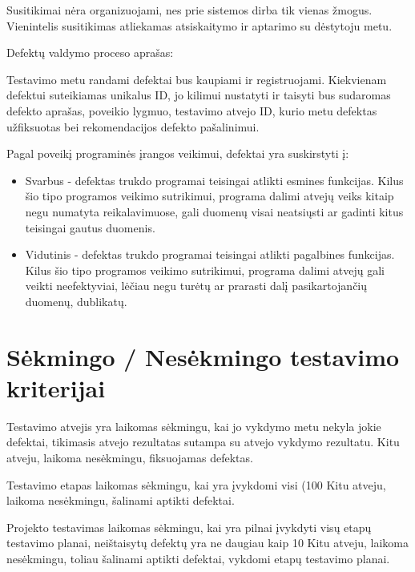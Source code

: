 Susitikimai nėra organizuojami, nes prie sistemos dirba tik vienas žmogus. 
Vienintelis susitikimas atliekamas atsiskaitymo ir aptarimo su dėstytoju metu.

Defektų valdymo proceso aprašas:

Testavimo metu randami defektai bus kaupiami ir registruojami. 
Kiekvienam defektui suteikiamas unikalus ID, jo kilimui nustatyti ir taisyti bus sudaromas defekto aprašas, poveikio lygmuo, testavimo atvejo ID, kurio metu defektas užfiksuotas bei rekomendacijos defekto pašalinimui.

Pagal poveikį programinės įrangos veikimui, defektai yra suskirstyti į:

\begin{itemize}
	\item Svarbus - defektas trukdo programai teisingai atlikti esmines funkcijas. Kilus šio tipo programos
	veikimo sutrikimui, programa dalimi atvejų veiks kitaip negu numatyta reikalavimuose,
	gali duomenų visai neatsiųsti ar gadinti kitus teisingai gautus duomenis.
	\item Vidutinis - defektas trukdo programai teisingai atlikti pagalbines funkcijas. Kilus šio tipo
	programos veikimo sutrikimui, programa dalimi atvejų gali veikti neefektyviai, lėčiau negu
	turėtų ar prarasti dalį pasikartojančių duomenų, dublikatų.
\end{itemize}

\section{Sėkmingo / Nesėkmingo testavimo kriterijai}

Testavimo atvejis yra laikomas sėkmingu, kai jo vykdymo metu nekyla jokie defektai, tikimasis atvejo rezultatas sutampa su atvejo vykdymo rezultatu. 
Kitu atveju, laikoma nesėkmingu, fiksuojamas defektas.

Testavimo etapas laikomas sėkmingu, kai yra įvykdomi visi (100%
Kitu atveju, laikoma nesėkmingu, šalinami aptikti defektai.

Projekto testavimas laikomas sėkmingu, kai yra pilnai įvykdyti visų etapų testavimo planai, neištaisytų defektų yra ne daugiau kaip 10%
Kitu atveju, laikoma nesėkmingu, toliau šalinami aptikti defektai, vykdomi etapų testavimo planai.

